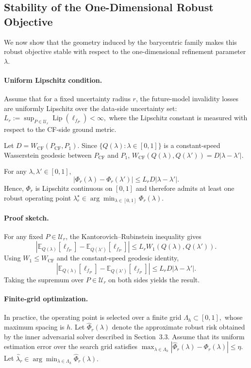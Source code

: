 \subsection{Stability of the One-Dimensional Robust Objective}

We now show that the geometry induced by the barycentric family makes
this robust objective stable with respect to the one-dimensional
refinement parameter $\lambda$.

\paragraph{Uniform Lipschitz condition.}
Assume that for a fixed uncertainty radius $r$, the future-model
invalidity losses are uniformly Lipschitz over the data-side uncertainty
set:
$
L_r
:=
\sup_{P\in\mathcal U_r}
\operatorname{Lip}(\ell_{f_P})
<
\infty,
$
where the Lipschitz constant is measured with respect to the CF-side
ground metric.

Let
$
D
=
W_{\mathrm{CF}}(P_{\mathrm{CF}},P_1).
$
Since $\{Q(\lambda):\lambda\in[0,1]\}$ is a constant-speed
Wasserstein geodesic between $P_{\mathrm{CF}}$ and $P_1$,
$
W_{\mathrm{CF}}
\left(
Q(\lambda),Q(\lambda')
\right)
=
D|\lambda-\lambda'|.
$

\begin{proposition}
For any $\lambda,\lambda'\in[0,1]$,
\[
\left|
\Phi_r(\lambda)
-
\Phi_r(\lambda')
\right|
\le
L_r D
|\lambda-\lambda'|.
\]
Hence, $\Phi_r$ is Lipschitz continuous on $[0,1]$ and therefore admits
at least one robust operating point
$
\lambda_r^\star
\in
\arg\min_{\lambda\in[0,1]}
\Phi_r(\lambda).
$
\end{proposition}

\paragraph{Proof sketch.}
For any fixed $P\in\mathcal U_r$, the Kantorovich--Rubinstein
inequality gives
\[
\left|
\mathbb E_{Q(\lambda)}
[\ell_{f_P}]
-
\mathbb E_{Q(\lambda')}
[\ell_{f_P}]
\right|
\le
L_r
W_1
\left(
Q(\lambda),Q(\lambda')
\right).
\]
Using $W_1\le W_{\mathrm{CF}}$ and the constant-speed geodesic identity,
\[
\left|
\mathbb E_{Q(\lambda)}
[\ell_{f_P}]
-
\mathbb E_{Q(\lambda')}
[\ell_{f_P}]
\right|
\le
L_rD|\lambda-\lambda'|.
\]
Taking the supremum over $P\in\mathcal U_r$ on both sides yields the
result.

\paragraph{Finite-grid optimization.}
In practice, the operating point is selected over a finite grid
$
\Lambda_h
\subset[0,1],
$
whose maximum spacing is $h$. Let
$
\widehat\Phi_r(\lambda)
$
denote the approximate robust risk obtained by the inner adversarial
solver described in Section~3.3. Assume that its uniform estimation
error over the search grid satisfies
$
\max_{\lambda\in\Lambda_h}
\left|
\widehat\Phi_r(\lambda)
-
\Phi_r(\lambda)
\right|
\le
\eta.
$
Let
$
\widehat\lambda_r
\in
\arg\min_{\lambda\in\Lambda_h}
\widehat\Phi_r(\lambda).
$

